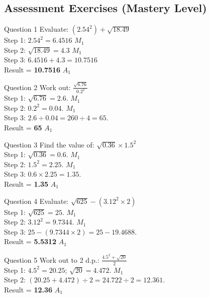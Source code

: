 \documentclass[12pt, a4paper, oneside]{article}
\begin{document}
\subsection*{Assessment Exercises (Mastery Level)}

\begin{solvingbox}{Question 1}
Evaluate: $(2.54^2) + \sqrt{18.49}$ \\
Step 1: $2.54^2 = 6.4516$ \hfill $M_1$ \\
Step 2: $\sqrt{18.49} = 4.3$ \hfill $M_1$ \\
Step 3: $6.4516 + 4.3 = 10.7516$ \\
Result = \textbf{10.7516} \hfill $A_1$
\end{solvingbox}

\begin{solvingbox}{Question 2}
Work out: $\frac{\sqrt{6.76}}{0.2^2}$ \\
Step 1: $\sqrt{6.76} = 2.6$. \hfill $M_1$ \\
Step 2: $0.2^2 = 0.04$. \hfill $M_1$ \\
Step 3: $2.6 \div 0.04 = 260 \div 4 = 65$. \\
Result = \textbf{65} \hfill $A_1$
\end{solvingbox}

\begin{solvingbox}{Question 3}
Find the value of: $\sqrt{0.36} \times 1.5^2$ \\
Step 1: $\sqrt{0.36} = 0.6$. \hfill $M_1$ \\
Step 2: $1.5^2 = 2.25$. \hfill $M_1$ \\
Step 3: $0.6 \times 2.25 = 1.35$. \\
Result = \textbf{1.35} \hfill $A_1$
\end{solvingbox}

\begin{solvingbox}{Question 4}
Evaluate: $\sqrt{625} - (3.12^2 \times 2)$ \\
Step 1: $\sqrt{625} = 25$. \hfill $M_1$ \\
Step 2: $3.12^2 = 9.7344$. \hfill $M_1$ \\
Step 3: $25 - (9.7344 \times 2) = 25 - 19.4688$. \\
Result = \textbf{5.5312} \hfill $A_1$
\end{solvingbox}

\begin{solvingbox}{Question 5}
Work out to 2 d.p.: $\frac{4.5^2 + \sqrt{20}}{2}$ \\
Step 1: $4.5^2 = 20.25$; $\sqrt{20} = 4.472$. \hfill $M_1$ \\
Step 2: $(20.25 + 4.472) \div 2 = 24.722 \div 2 = 12.361$. \\
Result = \textbf{12.36} \hfill $A_1$
\end{solvingbox}
\end{document}
